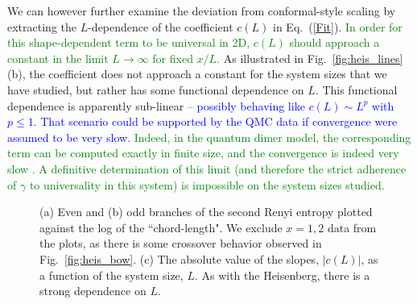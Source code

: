 \documentclass[prb,aps,twocolumn,floatfix,amsmath,amssymb,superscriptaddress,tightenlines]{revtex4}
\begin{document}
We can however further examine the deviation from conformal-style scaling by extracting the $L$-dependence of the coefficient $c(L)$ in Eq.~(\ref{Fit}).  \textcolor{green}{In order for this shape-dependent term to be universal in 2D, $c(L)$ should approach a constant in the limit $L \rightarrow \infty$ for fixed $x/L$.}
As illustrated in Fig.~\ref{fig:heis_lines}(b),
the coefficient does not approach a constant for the system sizes that we have studied, but rather has some functional dependence on $L$.
This functional dependence is apparently sub-linear \textcolor{blue}{ -- possibly behaving like $c(L) \sim L^p$ with $p\leq1$.  That scenario could be supported by the QMC data if convergence were assumed to be very slow.}  \textcolor{green}{Indeed, in the quantum dimer model, the corresponding term can be computed exactly in finite size, and the convergence is indeed very slow \cite{Stephan12}. A definitive determination of this limit (and therefore the strict adherence of $\gamma$ to universality in this system) is impossible on the system sizes studied.}

 \begin{figure}
   \begin{center}
   \end{center}
   \caption{(a) Even and (b) odd branches of the second Renyi entropy plotted against the log of the ``chord-length". We exclude $x=1,2$ data from the plots, as there is some crossover behavior observed in Fig.~\ref{fig:heis_bow}. (c) The absolute value of the slopes, $|c(L)|$, as a function of the system size, $L$. As with the Heisenberg, there is a strong dependence on $L$.}
   \label{fig:2}
 \end{figure}
\end{document}
